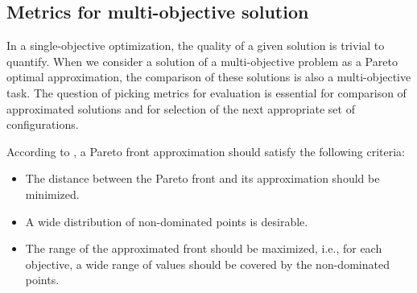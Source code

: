 

        \subsection{Metrics for multi-objective solution}
            In a single-objective optimization, the quality of a given solution is trivial to quantify. When we consider a solution of a multi-objective problem as a Pareto optimal approximation, the comparison of these solutions is also a multi-objective task.
            The question of picking metrics for evaluation is essential for comparison of approximated solutions and for selection of the next appropriate set of configurations.

            According to \cite{ZitzlerDT00}, a Pareto front approximation should satisfy the following criteria:
            \begin{itemize}
                \item The distance between the Pareto front and its approximation should be minimized.
                \item A wide distribution of non-dominated points is desirable.
                \item The range of the approximated front should be maximized, i.e., for each objective, a wide range of values should be covered by the non-dominated points.
            \end{itemize}

